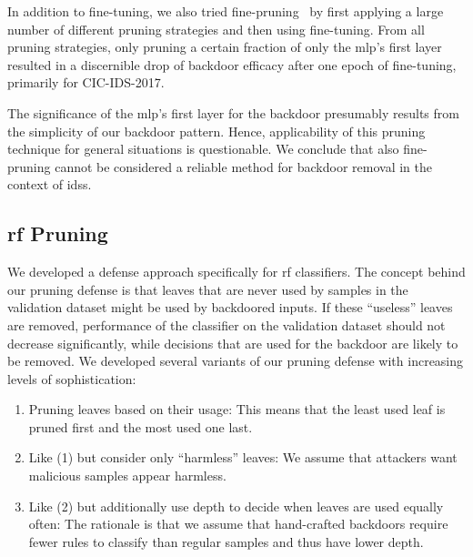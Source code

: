 \documentclass[10pt,sigconf,letterpaper,dvipsnames]{acmart}
\newcommand\note[2]{{\color{#1}#2}}
\newcommand\todo[1]{{\note{red}{TODO: #1}}}
\newcommand{\cic}{CIC-IDS-2017}
\begin{document}
In addition to fine-tuning, we also tried fine-pruning~\cite{liu_fine-pruning:_2018} by first applying a large number of different pruning strategies and then using fine-tuning. From all pruning strategies, only pruning a certain fraction of only the \gls{mlp}'s first layer resulted in a discernible drop of backdoor efficacy after one epoch of fine-tuning, primarily for \cic{}.

The significance of the \gls{mlp}'s first layer for the backdoor presumably results from the simplicity of our backdoor pattern. Hence, applicability of this pruning technique for general situations is questionable. We conclude that also fine-pruning cannot be considered a reliable method for backdoor removal in the context of \glspl{ids}.


\subsection{\gls{rf} Pruning}

We developed a defense approach specifically for \gls{rf} classifiers.
The concept behind our pruning defense is that leaves that are never used by samples in the validation dataset might be used by backdoored inputs. If these ``useless'' leaves are removed, performance of the classifier on the validation dataset should not decrease
significantly,
while decisions that are used for the backdoor are likely to be removed.
We developed several variants of our pruning defense with increasing levels of sophistication:
\begin{enumerate}[wide, labelwidth=!, labelindent=0pt]
\item Pruning leaves based on their usage: This means that the least used leaf is pruned first and the most used one last.
\item Like (1) but consider only ``harmless'' leaves: We assume that attackers want malicious samples appear harmless.
\item Like (2) but additionally use depth to decide when
leaves are used equally often: The rationale is that we assume that hand-crafted backdoors require fewer rules to classify than regular samples and thus have lower depth.
\end{enumerate}
\end{document}
